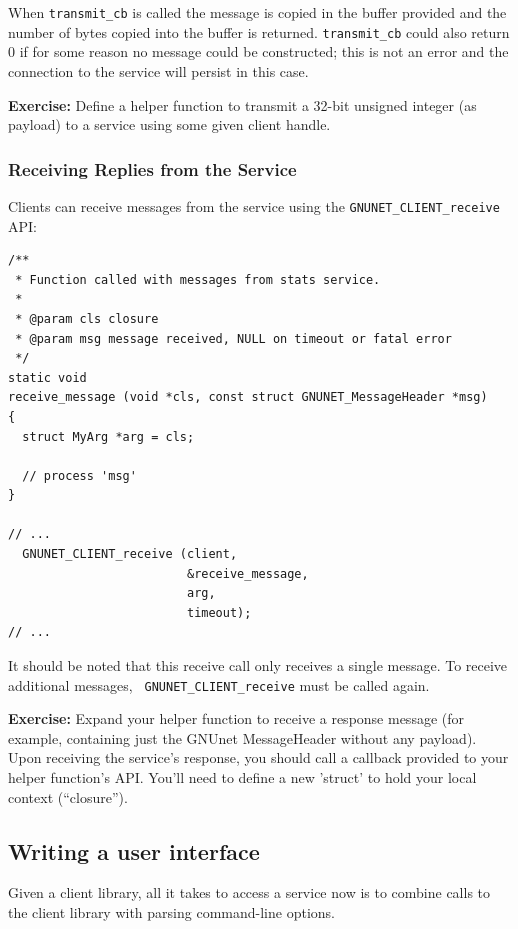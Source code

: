\documentclass[10pt]{article}
\newcommand{\exercise}[1]{\noindent\begin{boxedminipage}{\textwidth}{\bf Exercise:} #1 \end{boxedminipage}}
\begin{document}
When {\tt transmit\_cb} is called the message is copied in the buffer provided and 
the number of bytes copied into the buffer is returned. {\tt transmit\_cb} 
could also return 0 if for some reason no message
could be constructed; this is not an error and the connection to the
service will persist in this case.

\exercise{Define a helper function to transmit a 32-bit
unsigned integer (as payload) to a service using some given client
handle.}


\subsubsection{Receiving Replies from the Service}

Clients can receive messages from the service using the
{\tt GNUNET\_CLIENT\_receive} API:

\lstset{language=c}
\begin{lstlisting}
/**
 * Function called with messages from stats service.
 *
 * @param cls closure
 * @param msg message received, NULL on timeout or fatal error
 */
static void
receive_message (void *cls, const struct GNUNET_MessageHeader *msg)
{
  struct MyArg *arg = cls;

  // process 'msg'
}

// ... 
  GNUNET_CLIENT_receive (client,
                         &receive_message,
                         arg,
                         timeout);
// ...
\end{lstlisting}

It should be noted that this receive call only receives a single
message.  To receive additional messages, {\tt
  GNUNET\_CLIENT\_receive} must be called again.

\exercise{Expand your helper function to receive a
response message (for example, containing just the GNUnet MessageHeader
without any payload).  Upon receiving the service's response, you should
call a callback provided to your helper function's API.  You'll need to 
define a new 'struct' to hold your local context (``closure'').}


\subsection{Writing a user interface}

Given a client library, all it takes to access a service now is to
combine calls to the client library with parsing command-line
options.
\end{document}
